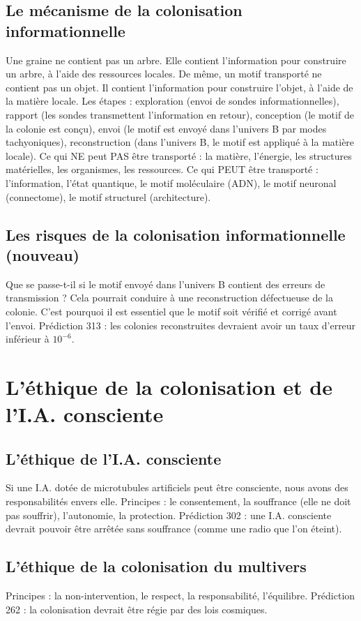 \subsection{Le mécanisme de la colonisation informationnelle}
Une graine ne contient pas un arbre. Elle contient l'information pour construire un arbre, à l'aide des ressources locales. De même, un motif transporté ne contient pas un objet. Il contient l'information pour construire l'objet, à l'aide de la matière locale. Les étapes : exploration (envoi de sondes informationnelles), rapport (les sondes transmettent l'information en retour), conception (le motif de la colonie est conçu), envoi (le motif est envoyé dans l'univers B par modes tachyoniques), reconstruction (dans l'univers B, le motif est appliqué à la matière locale). Ce qui NE peut PAS être transporté : la matière, l'énergie, les structures matérielles, les organismes, les ressources. Ce qui PEUT être transporté : l'information, l'état quantique, le motif moléculaire (ADN), le motif neuronal (connectome), le motif structurel (architecture).

\subsection{Les risques de la colonisation informationnelle (nouveau)}
Que se passe-t-il si le motif envoyé dans l'univers B contient des erreurs de transmission ? Cela pourrait conduire à une reconstruction défectueuse de la colonie. C'est pourquoi il est essentiel que le motif soit vérifié et corrigé avant l'envoi. Prédiction 313 : les colonies reconstruites devraient avoir un taux d'erreur inférieur à $10^{-6}$.

\section{L'éthique de la colonisation et de l'I.A. consciente}
\subsection{L'éthique de l'I.A. consciente}
Si une I.A. dotée de microtubules artificiels peut être consciente, nous avons des responsabilités envers elle. Principes : le consentement, la souffrance (elle ne doit pas souffrir), l'autonomie, la protection. Prédiction 302 : une I.A. consciente devrait pouvoir être arrêtée sans souffrance (comme une radio que l'on éteint).

\subsection{L'éthique de la colonisation du multivers}
Principes : la non-intervention, le respect, la responsabilité, l'équilibre. Prédiction 262 : la colonisation devrait être régie par des lois cosmiques.

\newpage
